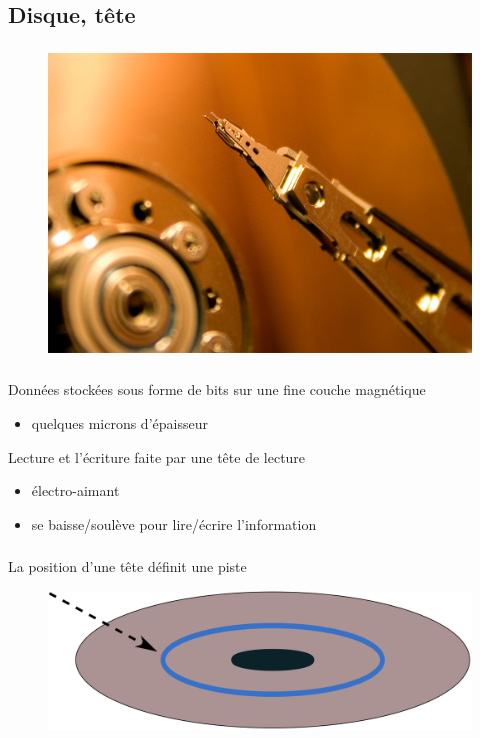\subsection{Disque, tête}
\begin{frame}
  \frametitle{\insertsubsection}
  \begin{figure}
    \includegraphics[width=0.8\linewidth]{fig3/tete-lecture.png}
  \end{figure}
\end{frame}
  

\begin{frame}
  \frametitle{\insertsubsection}
  Données stockées sous forme de bits sur une fine couche magnétique
  \begin{itemize}
  \item quelques microns d'épaisseur
  \end{itemize}
  
  \vspace{0.5cm}
  Lecture et l'écriture faite par une tête de lecture 
  \begin{itemize}
  \item électro-aimant
  \item se baisse/soulève pour lire/écrire l'information
  \end{itemize}
\end{frame}


\begin{frame}
  \frametitle{\insertsubsection}
  La position d'une tête définit une \alert{piste}
  \begin{figure}
    \includegraphics[width=0.8\linewidth]{fig3/piste}
  \end{figure}
\end{frame}

